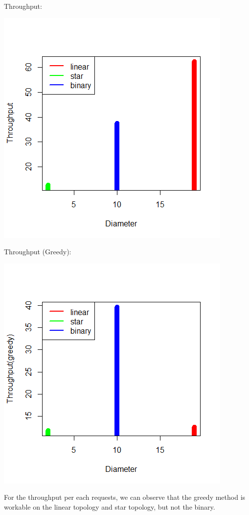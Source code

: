 \documentclass{article}
\begin{document}
\pagebreak
Throughput:

\begin{center}
    \includegraphics[width=.6\textwidth]{figs/s5} \\
\end{center}

Throughput (Greedy):

\begin{center}
    \includegraphics[width=.6\textwidth]{figs/s6} \\
\end{center}

For the throughput per each requests, we can observe that the greedy method is workable on the linear topology and star topology, but not the binary.
\end{document}
